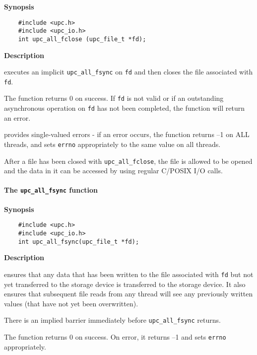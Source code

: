 {\bf Synopsis}

\npf\vspace{-2.5em}
\begin{verbatim}
    #include <upc.h> 
    #include <upc_io.h> 
    int upc_all_fclose (upc_file_t *fd); 
\end{verbatim}

{\bf Description}

 executes an implicit {\tt upc\_all\_fsync} on {\tt fd} and then closes
the file associated with {\tt fd}.

\np The function returns 0 on success. If {\tt fd} is not valid or if an outstanding
asynchronous operation on {\tt fd} has not been completed, the function will return an error.

 provides single-valued errors - if an error occurs, the
function returns --1 on ALL threads, and sets {\tt errno} appropriately
to the same value on all threads. 

\np After a file has been closed with {\tt upc\_all\_fclose}, the file 
is allowed to be
opened and the data in it can be accessed by using regular C/POSIX I/O calls.

\paragraph{The {\tt upc\_all\_fsync} function}

{\bf Synopsis}

\npf\vspace{-2.5em}
 \begin{verbatim}
    #include <upc.h>
    #include <upc_io.h>
    int upc_all_fsync(upc_file_t *fd);
\end{verbatim}

{\bf Description}

 ensures that any data that has been written to the
file associated with {\tt fd} but not yet transferred to the storage device is
transferred to the storage device. It also ensures that subsequent file
reads from any thread will see any previously written values (that have not
yet been overwritten).

\np There is an implied barrier immediately before {\tt upc\_all\_fsync} returns.

\np The function returns 0 on success. On error, it returns --1 and sets {\tt errno}
appropriately.

